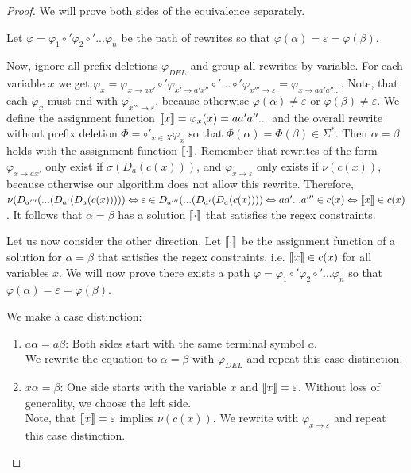 \begin{proof}
We will prove both sides of the equivalence separately.

Let $\varphi = \varphi_1 \circ' \varphi_2 \circ' ... \varphi_n$ be the path of rewrites so that $\varphi(\alpha) = \varepsilon = \varphi(\beta)$.

Now, ignore all prefix deletions $\varphi_{DEL}$ and group all rewrites by variable. For each variable $x$ we get $\varphi_x = \varphi_{x \rightarrow ax'} \circ' \varphi_{x' \rightarrow a'x''} \circ' ... \circ' \varphi_{x''' \rightarrow \varepsilon} = \varphi_{x \rightarrow aa'a''...}$. Note, that each $\varphi_x$ must end with $\varphi_{x''' \rightarrow \varepsilon}$, because otherwise $\varphi(\alpha) \neq \varepsilon$ or $
\varphi(\beta) \neq \varepsilon$. 
We define the assignment function $\llbracket x \rrbracket = \varphi_x(x) = aa'a''...$ and the overall rewrite without prefix deletion $\Phi = \circ'_{x \in X} \varphi_x$ so that $\Phi(\alpha) = \Phi(\beta) \in \Sigma^*$. Then $\alpha = \beta$ holds with the assignment function $\llbracket \cdot \rrbracket$.
Remember that rewrites of the form $\varphi_{x \rightarrow ax'}$ only exist if $\sigma(D_a(c(x)))$, and $\varphi_{x \rightarrow \varepsilon}$ only exists if $\nu(c(x))$, because otherwise our algorithm does not allow this rewrite. Therefore, $\nu(D_{a'''}(...(D_{a'}(D_a(c(x))))) \Leftrightarrow \varepsilon \in D_{a'''}(...(D_{a'}(D_a(c(x)))) \Leftrightarrow aa'...a''' \in c(x) \Leftrightarrow \llbracket x \rrbracket \in c(x)$.
It follows that $\alpha = \beta$ has a solution $\llbracket \cdot \rrbracket$ that satisfies the regex constraints.

Let us now consider the other direction. Let $\llbracket \cdot \rrbracket$ be the assignment function of a solution for $\alpha = \beta$ that satisfies the regex constraints, i.e. $\llbracket x \rrbracket \in c(x)$ for all variables $x$. We will now prove there exists a path $\varphi = \varphi_1 \circ' \varphi_2 \circ' ... \varphi_n$ so that $\varphi(\alpha) = \varepsilon = \varphi(\beta)$.

We make a case distinction:
\begin{enumerate}
    \item \label{proof_aa}
    $a\alpha = a\beta$: Both sides start with the same terminal symbol $a$.\\
    We rewrite the equation to $\alpha = \beta$ with $\varphi_{DEL}$ and repeat this case distinction.
    
    \item \label{proof_xe}
    $x\alpha = \beta$: One side starts with the variable $x$ and $\llbracket x \rrbracket = \varepsilon$. Without loss of generality, we choose the left side.\\
    Note, that $\llbracket x \rrbracket = \varepsilon$ implies $\nu(c(x))$. We rewrite with $\varphi_{x \rightarrow \varepsilon}$ and repeat this case distinction.
    

\end{enumerate}
\end{proof}
